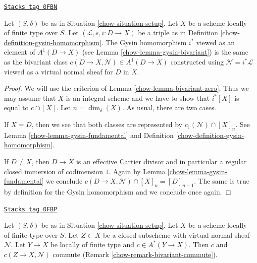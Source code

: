 \begin{lemma}
\label{chow-lemma-gysin-agrees}
\href{https://stacks.math.columbia.edu/tag/0FBN}{\texttt{Stacks tag 0FBN}}

Let $(S, \delta)$ be as in Situation \ref{chow-situation-setup}. Let $X$ be a scheme
locally of finite type over $S$. Let $(\mathcal{L}, s, i : D \to X)$
be a triple as in Definition \ref{chow-definition-gysin-homomorphism}.
The Gysin homomorphism $i^*$ viewed as an element of $A^1(D \to X)$
(see Lemma \ref{chow-lemma-gysin-bivariant}) is the same as the bivariant class
$c(D \to X, \mathcal{N}) \in A^1(D \to X)$
constructed using $\mathcal{N} = i^*\mathcal{L}$
viewed as a virtual normal sheaf for $D$ in $X$.
\end{lemma}

\begin{proof}

We will use the criterion of Lemma \ref{chow-lemma-bivariant-zero}.
Thus we may assume that $X$ is an integral scheme and
we have to show that $i^*[X]$ is equal to $c \cap [X]$.
Let $n = \dim_\delta(X)$. As usual, there are two cases.

\medskip\noindent
If $X = D$, then we see that both classes are represented by
$c_1(\mathcal{N}) \cap [X]_n$. See Lemma \ref{chow-lemma-gysin-fundamental}
and Definition \ref{chow-definition-gysin-homomorphism}.

\medskip\noindent
If $D \not = X$, then $D \to X$ is an effective Cartier divisor
and in particular a regular closed immersion of codimension $1$.
Again by Lemma \ref{chow-lemma-gysin-fundamental} we conclude
$c(D \to X, \mathcal{N}) \cap [X]_n = [D]_{n - 1}$. The same
is true by definition for the Gysin homomorphism and we conclude
once again.
\end{proof}

\begin{lemma}
\label{chow-lemma-gysin-commutes}
\href{https://stacks.math.columbia.edu/tag/0FBP}{\texttt{Stacks tag 0FBP}}

Let $(S, \delta)$ be as in Situation \ref{chow-situation-setup}. Let $X$ be a scheme
locally of finite type over $S$. Let $Z \subset X$ be a closed subscheme
with virtual normal sheaf $\mathcal{N}$. Let $Y \to X$ be locally of
finite type and $c \in A^*(Y \to X)$. Then $c$ and $c(Z \to X, \mathcal{N})$
commute (Remark \ref{chow-remark-bivariant-commute}).
\end{lemma}

